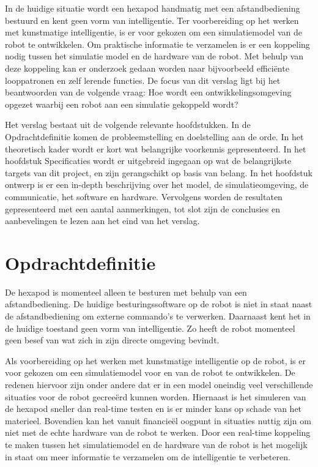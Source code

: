 \documentclass[10pt,a4paper]{article}
\begin{document}
In de huidige situatie wordt een hexapod handmatig met een afstandbediening bestuurd en kent geen vorm van intelligentie. Ter voorbereiding op het werken met kunstmatige intelligentie, is er voor gekozen om een simulatiemodel van de robot te ontwikkelen. Om praktische informatie te verzamelen is er een koppeling nodig tussen het simulatie model en de hardware van de robot. Met behulp van deze koppeling kan er onderzoek gedaan worden naar bijvoorbeeld effici\"ente looppatronen en zelf lerende functies.
De focus van dit verslag ligt bij het beantwoorden van de volgende vraag: Hoe wordt een ontwikkelingsomgeving opgezet waarbij een robot aan een simulatie gekoppeld wordt?

Het verslag bestaat uit de volgende relevante hoofdstukken. In de Opdrachtdefinitie komen de probleemstelling en doelstelling aan de orde. In het theoretisch kader wordt er kort wat belangrijke voorkennis gepresenteerd. In het hoofdstuk Specificaties wordt er uitgebreid ingegaan op wat de belangrijkste targets van dit project, en zijn gerangschikt op basis van belang. In het hoofdstuk ontwerp is er een in-depth beschrijving over het model, de simulatieomgeving, de communicatie, het software en hardware. Vervolgens worden de resultaten gepresenteerd met een aantal aanmerkingen, tot slot zijn de conclusies en aanbevelingen te lezen aan het eind van het verslag.

\newpage
\section{Opdrachtdefinitie} 
De hexapod is momenteel alleen te besturen met behulp van een afstandbediening. De huidige besturingssoftware op de robot is niet in staat naast de afstandbediening om externe commando's te verwerken. Daarnaast kent het in de huidige toestand geen vorm van intelligentie. Zo heeft de robot momenteel geen besef van wat zich in zijn directe omgeving bevindt.

Als voorbereiding op het werken met kunstmatige intelligentie op de robot, is er voor gekozen om een simulatiemodel voor en van de robot te ontwikkelen. De redenen hiervoor zijn onder andere dat er in een model oneindig veel verschillende situaties voor de robot gecree\"erd kunnen worden. Hiernaast is het simuleren van de hexapod sneller dan real-time testen en is er minder kans op schade van het materieel. Bovendien kan het vanuit financie\"el oogpunt in situaties nuttig zijn om niet met de echte hardware van de robot te werken. 
Door een real-time koppeling te maken tussen het simulatiemodel en de hardware van de robot is het mogelijk in staat om meer informatie te verzamelen om de intelligentie te verbeteren.
\end{document}
